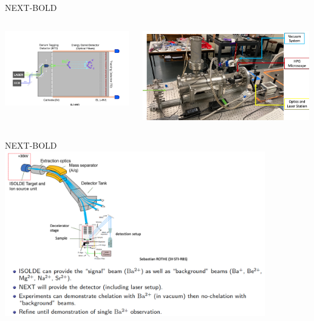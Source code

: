 \documentclass [aspectratio=169]{beamer}
\begin{document}
\begin{frame}{NEXT-BOLD}
\begin{columns}

\includegraphics[width=0.99\textwidth]{nextBold.png}

\includegraphics[width=0.99\textwidth]{boldPrototypes.png}
\end{columns}
\end{frame}

\begin{frame}{NEXT-BOLD}
\includegraphics[width=0.85\textwidth]{ba2Cern.png}
\end{frame}
\end{document}
